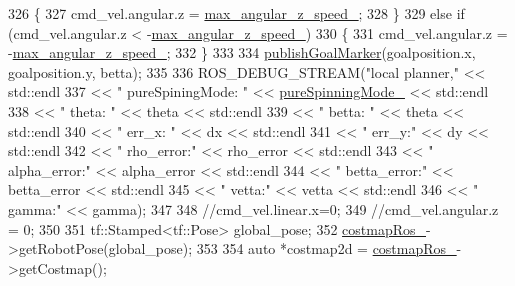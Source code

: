 \begin{DoxyCode}
{326     \{
327         cmd\_vel.angular.z = \hyperlink{classmove__base__z__client_1_1backward__local__planner_1_1BackwardLocalPlanner_a8b5cbc273dfcf1c5e15ac4475b45ca97}{max\_angular\_z\_speed\_};
328     \}
329     \textcolor{keywordflow}{else} \textcolor{keywordflow}{if} (cmd\_vel.angular.z < -\hyperlink{classmove__base__z__client_1_1backward__local__planner_1_1BackwardLocalPlanner_a8b5cbc273dfcf1c5e15ac4475b45ca97}{max\_angular\_z\_speed\_})
330     \{
331         cmd\_vel.angular.z = -\hyperlink{classmove__base__z__client_1_1backward__local__planner_1_1BackwardLocalPlanner_a8b5cbc273dfcf1c5e15ac4475b45ca97}{max\_angular\_z\_speed\_};
332     \}
333 
334     \hyperlink{classmove__base__z__client_1_1backward__local__planner_1_1BackwardLocalPlanner_a691e565d33666d2f7004e791cae29b42}{publishGoalMarker}(goalposition.x, goalposition.y, betta);
335 
336     ROS\_DEBUG\_STREAM(\textcolor{stringliteral}{"local planner,"} << std::endl
337                                       << \textcolor{stringliteral}{" pureSpiningMode: "} << 
      \hyperlink{classmove__base__z__client_1_1backward__local__planner_1_1BackwardLocalPlanner_abf2b84c0d7a841a7fcec1b93bf5fdd0e}{pureSpinningMode\_} << std::endl
338                                       << \textcolor{stringliteral}{" theta: "} << theta << std::endl
339                                       << \textcolor{stringliteral}{" betta: "} << theta << std::endl
340                                       << \textcolor{stringliteral}{" err\_x: "} << dx << std::endl
341                                       << \textcolor{stringliteral}{" err\_y:"} << dy << std::endl
342                                       << \textcolor{stringliteral}{" rho\_error:"} << rho\_error << std::endl
343                                       << \textcolor{stringliteral}{" alpha\_error:"} << alpha\_error << std::endl
344                                       << \textcolor{stringliteral}{" betta\_error:"} << betta\_error << std::endl
345                                       << \textcolor{stringliteral}{" vetta:"} << vetta << std::endl
346                                       << \textcolor{stringliteral}{" gamma:"} << gamma);
347 
348     \textcolor{comment}{//cmd\_vel.linear.x=0;}
349     \textcolor{comment}{//cmd\_vel.angular.z = 0;}
350 
351     tf::Stamped<tf::Pose> global\_pose;
352     \hyperlink{classmove__base__z__client_1_1backward__local__planner_1_1BackwardLocalPlanner_a865618f84238fe6ff437d1e38ec5fec0}{costmapRos\_}->getRobotPose(global\_pose);
353 
354     \textcolor{keyword}{auto} *costmap2d = \hyperlink{classmove__base__z__client_1_1backward__local__planner_1_1BackwardLocalPlanner_a865618f84238fe6ff437d1e38ec5fec0}{costmapRos\_}->getCostmap();
}
\end{DoxyCode}
